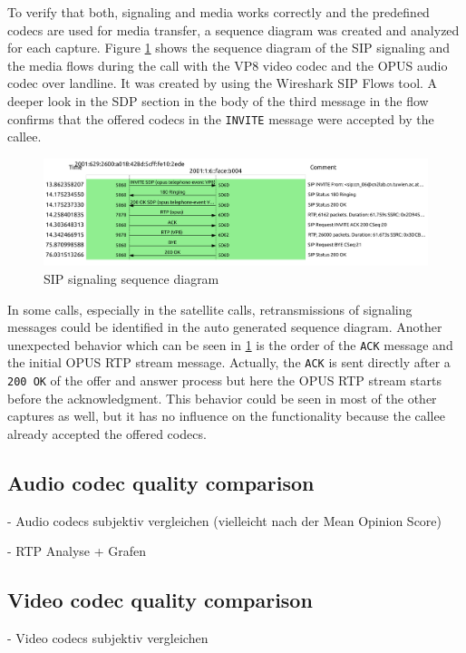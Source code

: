 \documentclass[parskip=full]{scrartcl}
\begin{document}
To verify that both, signaling and media works correctly and the predefined codecs are used for media transfer, a sequence diagram was created and analyzed for each capture.
Figure \ref{fig:sigFlow} shows the sequence diagram of the SIP signaling and the media flows during the call with the VP8 video codec and the OPUS audio codec over landline. 
It was created by using the Wireshark SIP Flows tool. 
A deeper look in the SDP section in the body of the third message in the flow confirms that the offered codecs in the \verb|INVITE| message were accepted by the callee.

\begin{figure}[!ht]
	\centering %
	\includegraphics[width=\textwidth]{images/VP8_OPUS_landline_flow.pdf} %
	\caption{SIP signaling sequence diagram} 
	\label{fig:sigFlow} %
\end{figure} 
In some calls, especially in the satellite calls, retransmissions of signaling messages could be identified in the auto generated sequence diagram. 
Another unexpected behavior which can be seen in \cref{fig:sigFlow} is the order of the \verb|ACK| message and the initial OPUS RTP stream message. 
Actually, the \verb|ACK| is sent directly after a \verb|200 OK| of the offer and answer process but here the OPUS RTP stream starts before the acknowledgment.
This behavior could be seen in most of the other captures as well, but it has no influence on the functionality because the callee already accepted the offered codecs.

\subsection{Audio codec quality comparison} \label{subsec:audio}
- Audio codecs subjektiv  vergleichen (vielleicht nach der Mean Opinion Score)

- RTP Analyse + Grafen
\subsection{Video codec quality comparison} \label{subsec:video}
- Video codecs subjektiv vergleichen  
\end{document}
